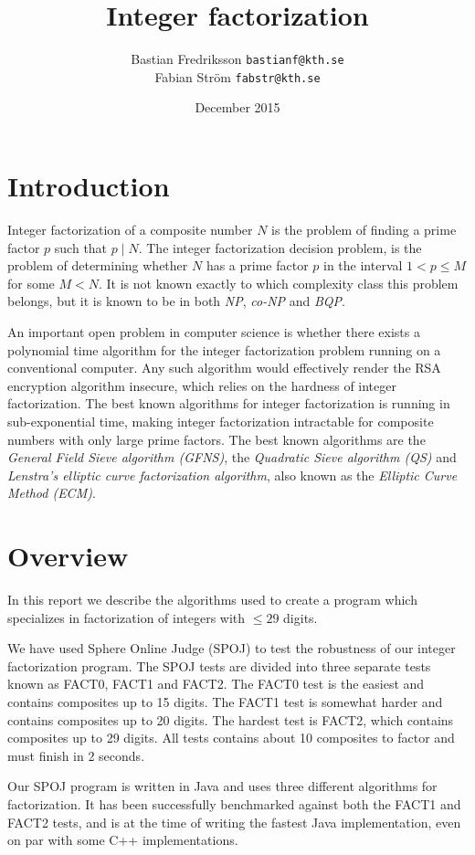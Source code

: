 \documentclass{article}
\title{Integer factorization}
\author{Bastian Fredriksson \texttt{bastianf@kth.se}\\Fabian Ström \texttt{fabstr@kth.se}}
\date{December 2015}
\begin{document}
\maketitle
\newpage

\tableofcontents
\newpage

\section{Introduction}
Integer factorization of a composite number $N$ is the problem of finding a prime factor $p$ such that $p \mid N$. The integer factorization decision problem, is the problem of determining whether $N$ has a prime factor $p$ in the interval $1 < p \le M$ for some $M < N$. It is not known exactly to which complexity class this problem belongs, but it is known to be in both \textit{NP}, \textit{co-NP} and \textit{BQP}. 

An important open problem in computer science is whether there exists a polynomial time algorithm for the integer factorization problem running on a conventional computer. Any such algorithm would effectively render the RSA encryption algorithm insecure, which relies on the hardness of  integer factorization. The best known algorithms for integer factorization is running in sub-exponential time, making integer factorization intractable for composite numbers with only large prime factors. The best known algorithms are the \textit{General Field Sieve algorithm (GFNS)}, the \textit{Quadratic Sieve algorithm (QS)} and \textit{Lenstra's elliptic curve factorization algorithm}, also known as the \textit{Elliptic Curve Method (ECM)}. 

\section{Overview}
In this report we describe the algorithms used to create a program which specializes in factorization of integers with $\leq 29$ digits.

We have used Sphere Online Judge (SPOJ) to test the robustness of our integer factorization program. The SPOJ tests are divided into three separate tests known as FACT0, FACT1 and FACT2. The FACT0 test is the easiest and contains composites up to 15 digits. The FACT1 test is somewhat harder and contains composites up to 20 digits. The hardest test is FACT2, which contains composites up to 29 digits. All tests contains about 10 composites to factor and must finish in 2 seconds. 

Our SPOJ program is written in Java and uses three different algorithms for factorization. It has been successfully benchmarked against both the FACT1 and FACT2 tests, and is at the time of writing the fastest Java implementation, even on par with some C++ implementations.
\end{document}
